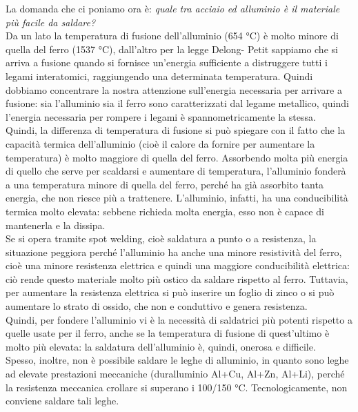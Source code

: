 La domanda che ci poniamo ora è: \textit{quale tra acciaio ed alluminio è
il materiale più facile da saldare?}\\
Da un lato la temperatura di fusione dell’alluminio (654 °C) è molto
minore di quella del ferro (1537 °C), dall’altro per la legge Delong-
Petit sappiamo che si arriva a fusione quando si fornisce un’energia
sufficiente a distruggere tutti i legami interatomici, raggiungendo una determinata temperatura. Quindi dobbiamo concentrare la nostra attenzione sull’energia necessaria per arrivare a fusione: sia l’alluminio sia il ferro sono caratterizzati dal legame metallico, quindi l’energia necessaria per rompere i legami è spannometricamente la stessa.\\
Quindi, la differenza di temperatura di fusione si può spiegare con il fatto che la capacità termica dell’alluminio (cioè il calore da fornire per aumentare la temperatura) è molto maggiore di quella del ferro. Assorbendo molta più energia di quello che serve per scaldarsi e aumentare di temperatura, l’alluminio fonderà a una temperatura minore di quella del ferro, perché ha già assorbito tanta energia, che non riesce più a trattenere. L’alluminio, infatti, ha una conducibilità termica molto elevata: sebbene richieda molta energia, esso non è capace di mantenerla e la dissipa.\\
Se si opera tramite spot welding, cioè saldatura a punto o a resistenza, la situazione peggiora perché l’alluminio ha anche una minore resistività del ferro, cioè una minore resistenza elettrica e quindi una maggiore conducibilità elettrica: ciò rende questo materiale molto più ostico da saldare rispetto al ferro. Tuttavia, per aumentare la resistenza elettrica si può inserire un foglio di zinco o si può aumentare lo strato di ossido, che non e conduttivo e genera resistenza.\\
Quindi, per fondere l’alluminio vi è la necessità di saldatrici più potenti rispetto a quelle usate per il ferro, anche se la temperatura di fusione di quest’ultimo è molto più elevata: la saldatura dell’alluminio è, quindi, onerosa e difficile.   \\
Spesso, inoltre, non è possibile saldare le leghe di alluminio, in quanto sono leghe ad elevate prestazioni meccaniche (duralluminio Al+Cu, Al+Zn, Al+Li), perché la resistenza meccanica crollare si superano i 100/150 °C. Tecnologicamente, non conviene saldare tali leghe.

